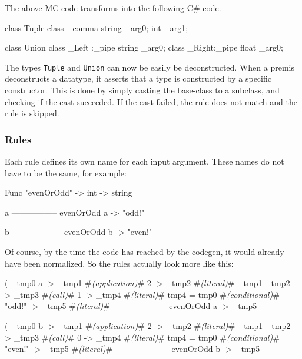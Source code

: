 The above MC code transforms into the following C\# code.

\begin{CS}
class Tuple{}
class _comma { string _arg0; int _arg1;}

class Union{}
class _Left :_pipe {string _arg0;}
class _Right:_pipe {float  _arg0;}
\end{CS}

The types \verb|Tuple| and \verb|Union| can now be easily be deconstructed.
When a premis deconstructs a datatype, it asserts that a type is constructed by a specific constructor.
This is done by simply casting the base-class to a subclass, and checking if the cast succeeded.
If the cast failed, the rule does not match and the rule is skipped.

\subsubsection{Rules}\label{codegen_rules}

Each rule defines its own name for each input argument.
These names do not have to be the same, for example:

\begin{MC}
    Func "evenOrOdd" -> int -> string
    
    a%
    -----------------
    evenOrOdd a -> "odd!"

    b%
    ------------------
    evenOrOdd b -> "even!"
\end{MC}

Of course, by the time the code has reached by the codegen, it would already have been normalized.
So the rules actually look more like this:

\begin{MC}[escapeinside=\#\#]
    (%
    _tmp0 a -> _tmp1     #\textit{(application)}#
    2 -> _tmp2           #\textit{(literal)}#
    _tmp1 _tmp2 -> _tmp3 #\textit{(call)}#
    1 -> _tmp4           #\textit{(literal)}#
    tmp4 = tmp0          #\textit{(conditional)}#
    "odd!" -> _tmp5      #\textit{(literal)}#
    --------------------
    evenOrOdd a -> _tmp5
\end{MC}

\begin{MC}[escapeinside=\#\#]
    (%
    _tmp0 b -> _tmp1     #\textit{(application)}#
    2 -> _tmp2           #\textit{(literal)}#
    _tmp1 _tmp2 -> _tmp3 #\textit{(call)}#
    0 -> _tmp4           #\textit{(literal)}#
    tmp4 = tmp0          #\textit{(conditional)}#
    "even!" -> _tmp5     #\textit{(literal)}#
    --------------------
    evenOrOdd b -> _tmp5
\end{MC}

